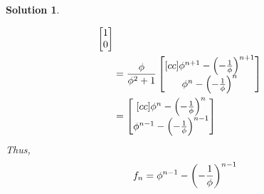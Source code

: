 \documentclass[11pt]{scrartcl}
\theoremstyle{dotlessP}
\newtheorem{sol}{Solution}[section]
\theoremstyle{dotlessN}
\DeclarePairedDelimiter\paren{(}{)} %
\begin{document}
\begin{sol}
\begin{enumerate}[(a)]
\begin{align*}
\begin{bmatrix}
	1 \\
	0
\end{bmatrix} \\
		&= 
		\frac{\phi}{\phi^2 + 1}
		\begin{bmatrix}[cc]
			\phi^{n+1} - \paren*{-\frac{1}{\phi}}^{n+1} \\
\phi^n - \paren*{-\frac{1}{\phi}}^n 
		\end{bmatrix} \\
		&= 
		\begin{bmatrix}[cc]
			\phi^{n} - \paren*{-
				\frac{1}{\phi}
			}^{n} \\
			\phi^{n-1} - \paren*{-
				\frac{1}{\phi}
			}^{n-1}
		\end{bmatrix}
	\end{align*}
	Thus, 
	\[
		f_n = \phi^{n-1} - \paren*{
			-\frac{1}{\phi}
		}^{n-1}
	\] 
		\end{enumerate}
	\end{sol}
\end{document}
